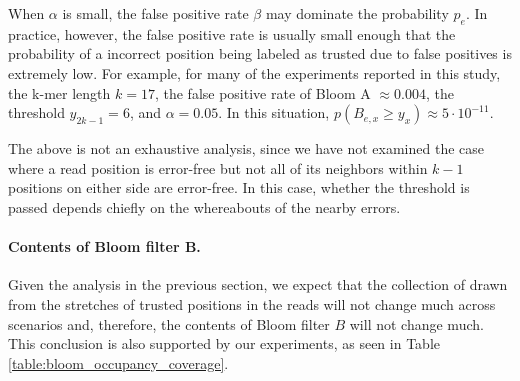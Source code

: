 \documentclass[10pt]{article}
\begin{document}
When $\alpha$ is small, the false positive rate $\beta$ may dominate the probability $p_e$.  In practice, however, the false positive rate is usually small enough that the probability of a incorrect position being labeled as trusted due to false positives is extremely low.  For example, for many of the experiments reported in this study, the k-mer length $k=17$, the false positive rate of Bloom A $\approx 0.004$, the threshold $y_{2k-1} = 6$, and $\alpha = 0.05$.  In this situation, $p(B_{e, x}\geq y_x) \approx 5 \cdot 10^{-11}.$

The above is not an exhaustive analysis, since we have not examined the case where a read position is error-free but not all of its neighbors within $k-1$ positions on either side are error-free.  In this case, whether the threshold is passed depends chiefly on the whereabouts of the nearby errors.

\paragraph{Contents of Bloom filter B.}
Given the analysis in the previous section, we expect that the collection of \kmers drawn from the stretches of trusted positions in the reads will not change much across scenarios and, therefore, the contents of Bloom filter $B$ will not change much.  This conclusion is also supported by our experiments, as seen in Table \ref{table:bloom_occupancy_coverage}.



\end{document}
